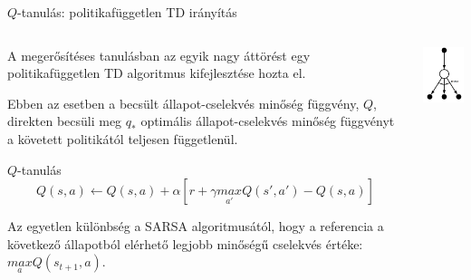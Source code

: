 \documentclass[english, aspectratio=169]{beamer}
\begin{document}
\begin{frame}{$Q$-tanulás: politikafüggetlen TD irányítás}
\begin{columns}
\begin{column}{.75\textwidth}
A megerősítéses tanulásban az egyik nagy áttörést egy politikafüggetlen TD algoritmus kifejlesztése hozta el.\par\smallskip
Ebben az esetben a becsült állapot-cselekvés minőség függvény, $Q$, direkten becsüli meg  $q_*$ optimális állapot-cselekvés minőség függvényt a követett politikától teljesen függetlenül.
\begin{block}{$Q$-tanulás}
\[
Q(s,a) \leftarrow Q(s,a) + \alpha \left[ r + \gamma \underset{a'}{max}Q(s',a') - Q(s,a) \right]
\]
\end{block}
Az egyetlen különbség a SARSA algoritmusától, hogy a referencia a következő állapotból elérhető legjobb minőségű cselekvés értéke: $\underset{a}{max}Q(s_{t+1},a)$.
\end{column}
\begin{column}{.25\textwidth}
\begin{center}
\includegraphics[width=3cm, keepaspectratio]{images/ql_2.png}
\end{center}
\end{column}
\end{columns}
\end{frame}
\end{document}
